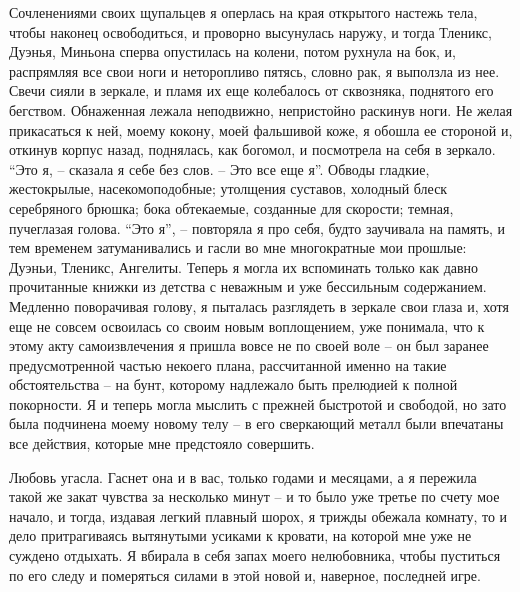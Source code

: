 Сочленениями  своих щупальцев  я оперлась  на края  открытого настежь  тела,
чтобы наконец освободиться,  и проворно высунулась наружу,  и тогда Тленикс,
Дуэнья,  Миньона сперва  опустилась  на  колени, потом  рухнула  на бок,  и,
распрямляя все  свои ноги и  неторопливо пятясь,  словно рак, я  выползла из
нее.  Свечи  сияли в  зеркале,  и  пламя  их  еще колебалось  от  сквозняка,
поднятого его  бегством. Обнаженная лежала неподвижно,  непристойно раскинув
ноги.  Не желая  прикасаться к  ней, моему  кокону, моей  фальшивой коже,  я
обошла  ее стороной  и,  откинув  корпус назад,  поднялась,  как богомол,  и
посмотрела на себя  в зеркало. ``Это я,  -- сказала я себе без  слов. -- Это
все  еще  я''.  Обводы  гладкие,  жестокрылые,  насекомоподобные;  утолщения
суставов, холодный блеск серебряного  брюшка; бока обтекаемые, созданные для
скорости; темная,  пучеглазая голова.  ``Это я'', --  повторяла я  про себя,
будто заучивала  на память,  и тем  временем затуманивались  и гасли  во мне
многократные  мои прошлые:  Дуэньи,  Тленикс, Ангелиты.  Теперь  я могла  их
вспоминать только как  давно прочитанные книжки из детства с  неважным и уже
бессильным содержанием. Медленно поворачивая голову, я пыталась разглядеть в
зеркале  свои  глаза  и,  хотя  еще  не  совсем  освоилась  со  своим  новым
воплощением, уже понимала, что к этому акту самоизвлечения я пришла вовсе не
по  своей воле  --  он  был заранее  предусмотренной  частью некоего  плана,
рассчитанной именно на  такие обстоятельства -- на  бунт, которому надлежало
быть  прелюдией к  полной покорности.  Я и  теперь могла  мыслить с  прежней
быстротой и  свободой, но  зато была  подчинена моему новому  телу --  в его
сверкающий  металл  были  впечатаны  все действия,  которые  мне  предстояло
совершить.

Любовь  угасла.  Гаснет  она  и  в  вас,  только годами и месяцами, а я
пережила такой же закат чувства за несколько минут -- и то было  уже  третье
по счету мое начало, и тогда, издавая легкий плавный шорох, я трижды обежала
комнату,  то  и  дело притрагиваясь вытянутыми усиками к кровати, на которой
мне уже не суждено отдыхать. Я вбирала в себя запах моего нелюбовника, чтобы
пуститься по его следу  и  померяться  силами  в  этой  новой  и,  наверное,
последней игре.

